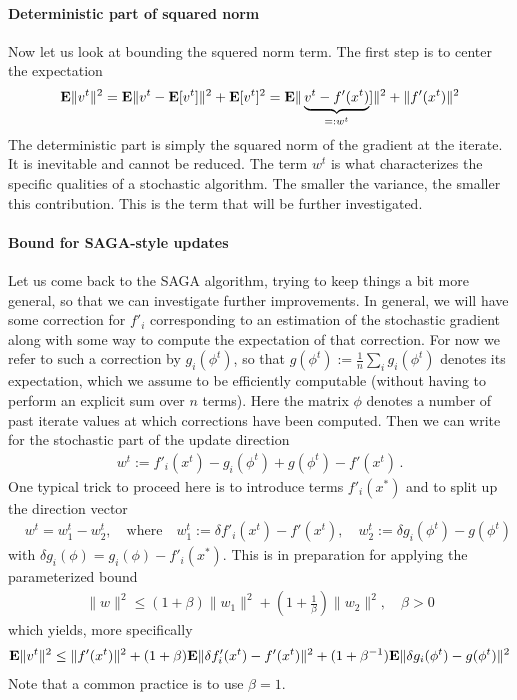 \documentclass{article}
\newcommand{\E}{{\bf E}}
\begin{document}
\paragraph*{Deterministic part of squared norm}
Now let us look at  bounding the squered norm term.  The first step is to center the expectation 
\begin{align}
\E \| v^t \|^2 = \E \| v^t - \E[v^t] \|^2 + \E[v^t]^2
= \E \| \underbrace{v^t - f'(x^t)}_{=:w^t}  ] \|^2 + \| f'(x^t)\|^2
\label{eq:bound_vt}
\end{align}
The deterministic part is simply the squared norm of the gradient at the iterate. It is inevitable and cannot be reduced. The term $w^t$ is what characterizes the specific qualities of a stochastic algorithm. The smaller the variance, the smaller this contribution. This is the term that will be further investigated. 

\paragraph*{Bound for SAGA-style updates} 
Let us come back to the SAGA algorithm, trying to keep things a bit more general, so that we can investigate further improvements. In general, we will have some correction for $f'_i$ corresponding to an estimation of the stochastic gradient along with some way to compute the expectation of that correction. For now we refer to such a  correction by $g_i(\phi^t)$, so that $g(\phi^t) := \frac 1n \sum_i  g_i(\phi^t)$ denotes its expectation, which we assume to be efficiently computable (without having to perform an explicit sum over $n$ terms). Here the matrix $\phi$ denotes a number of  past iterate values at which corrections have been computed. Then we can write for the stochastic part of the update direction 
\begin{align}
w^t := f'_i(x^t) - g_i(\phi^t) + g(\phi^t) - f'(x^t) \,. 
\end{align}
One typical trick to proceed here is to introduce terms $f'_i(x^*)$ and to split up the direction vector 
\begin{align}
& w^t = w_1^t - w_2^t, \quad \text{where} \quad w_1^t := \delta f'_i(x^t) - f'(x^t), 
\quad w_2^t := \delta g_i(\phi^t) - g(\phi^t) 
\end{align}
with $\delta g_i(\phi) = g_i(\phi)-f'_i(x^*)$. This is in preparation for applying the parameterized bound 
\begin{align}
\| w\|^2 \leq (1 + \beta) \|w_1\|^2 + (1 + \frac 1 \beta) \| w_2\|^2, \quad \beta >0 
\label{eq:beta_bound}
\end{align}
which yields, more specifically
\begin{align}
\nonumber
\E \| v^t \|^2 \leq \| f'(x^t) \|^2 + (1+\beta) \E \| \delta f'_i(x^t) - f'(x^t)\|^2 + (1+\beta^{-1}) \E \|  \delta g_i(\phi^t)  - g(\phi^t)\|^2
\end{align}
Note that a common practice is to use $\beta=1$.
\end{document}
